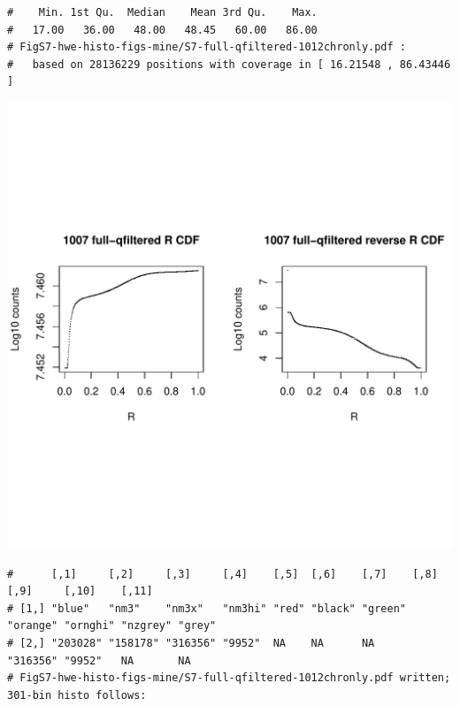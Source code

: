 \documentclass{article}\usepackage[]{graphicx}\usepackage[]{color}
\makeatletter
\def\maxwidth{ %
  \ifdim\Gin@nat@width>\linewidth
    \linewidth
  \else
    \Gin@nat@width
  \fi
}
\newenvironment{kframe}{%
 \def\at@end@of@kframe{}%
 \ifinner\ifhmode%
  \def\at@end@of@kframe{\end{minipage}}%
  \begin{minipage}{\columnwidth}%
 \fi\fi%
 \def\FrameCommand##1{\hskip\@totalleftmargin \hskip-\fboxsep
 \colorbox{shadecolor}{##1}\hskip-\fboxsep
     \hskip-\linewidth \hskip-\@totalleftmargin \hskip\columnwidth}%
 \MakeFramed {\advance\hsize-\width
   \@totalleftmargin\z@ \linewidth\hsize
   \@setminipage}}%
 {\par\unskip\endMakeFramed%
 \at@end@of@kframe}
\newenvironment{knitrout}{}{} %
\makeatother
\begin{document}
\begin{knitrout}
\begin{kframe}
\begin{verbatim}
#    Min. 1st Qu.  Median    Mean 3rd Qu.    Max. 
#   17.00   36.00   48.00   48.45   60.00   86.00 
# FigS7-hwe-histo-figs-mine/S7-full-qfiltered-1012chronly.pdf :
#   based on 28136229 positions with coverage in [ 16.21548 , 86.43446 ]
\end{verbatim}
\end{kframe}
\includegraphics[width=\maxwidth]{FigS7-hwe-histo-figs-knitr/unnamed-chunk-10-30} 
\begin{kframe}\begin{verbatim}
#      [,1]     [,2]     [,3]     [,4]    [,5]  [,6]    [,7]    [,8]     [,9]     [,10]    [,11] 
# [1,] "blue"   "nm3"    "nm3x"   "nm3hi" "red" "black" "green" "orange" "ornghi" "nzgrey" "grey"
# [2,] "203028" "158178" "316356" "9952"  NA    NA      NA      "316356" "9952"   NA       NA    
# FigS7-hwe-histo-figs-mine/S7-full-qfiltered-1012chronly.pdf written; 301-bin histo follows:
\end{verbatim}
\end{kframe}

\end{knitrout}
\end{document}
